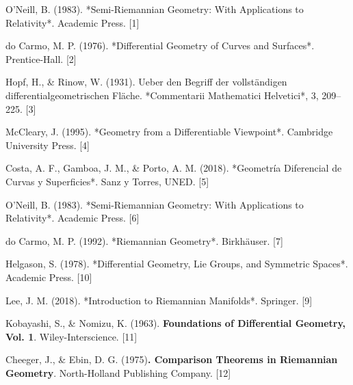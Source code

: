 \documentclass[12pt, a4paper]{report}
\theoremstyle{miestilo}
\theoremstyle{midefinicion}
\begin{document}
\begin{thebibliography}{9}

O'Neill, B. (1983). *Semi-Riemannian Geometry: With Applications to Relativity*. Academic Press. [1]

do Carmo, M. P. (1976). *Differential Geometry of Curves and Surfaces*. Prentice-Hall. [2]

Hopf, H., \& Rinow, W. (1931). Ueber den Begriff der vollständigen differentialgeometrischen Fläche. *Commentarii Mathematici Helvetici*, 3, 209–225. [3]

McCleary, J. (1995). *Geometry from a Differentiable Viewpoint*. Cambridge University Press. [4]

Costa, A. F., Gamboa, J. M., \& Porto, A. M. (2018). *Geometría Diferencial de Curvas y Superficies*. Sanz y Torres, UNED. [5]

O'Neill, B. (1983). *Semi-Riemannian Geometry: With Applications to Relativity*. Academic Press. [6]

do Carmo, M. P. (1992). *Riemannian Geometry*. Birkhäuser. [7]

Helgason, S. (1978). *Differential Geometry, Lie Groups, and Symmetric Spaces*. Academic Press. [10]

Lee, J. M. (2018). *Introduction to Riemannian Manifolds*. Springer. [9]

Kobayashi, S., & Nomizu, K. (1963). \textbf{Foundations of Differential Geometry, Vol. 1}. Wiley-Interscience. [11]

Cheeger, J., & Ebin, D. G. (1975)\textbf{. Comparison Theorems in Riemannian Geometry}. North-Holland Publishing Company. [12]

\end{thebibliography}
\end{document}
